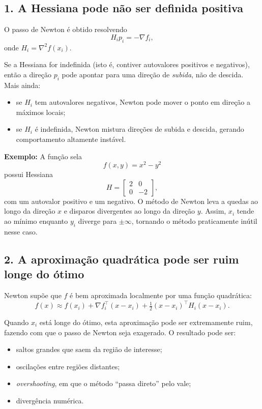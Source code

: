 \documentclass[9pt,a4paper]{extarticle}
\begin{document}
\subsection*{1. A Hessiana pode não ser definida positiva}

O passo de Newton é obtido resolvendo
\[
H_i p_i = -\nabla f_i,
\]
onde $H_i = \nabla^2 f(x_i)$.

Se a Hessiana for indefinida (isto é, contiver autovalores positivos e negativos), 
então a direção $p_i$ pode apontar para uma direção de \emph{subida}, não de 
descida. Mais ainda:

\begin{itemize}
    \item se $H_i$ tem autovalores negativos, Newton pode mover o ponto em direção 
    a máximos locais;
    \item se $H_i$ é indefinida, Newton mistura direções de subida e descida,
    gerando comportamento altamente instável.
\end{itemize}

\noindent
\textbf{Exemplo:} A função sela
\[
f(x,y) = x^2 - y^2
\]
possui Hessiana
\[
H = \begin{bmatrix}
2 & 0\\
0 & -2
\end{bmatrix},
\]
com um autovalor positivo e um negativo. O método de Newton leva a quedas ao longo 
da direção $x$ e disparos divergentes ao longo da direção $y$. Assim, $x_i$ 
tende ao mínimo enquanto $y_i$ diverge para $\pm\infty$, tornando o método 
praticamente inútil nesse caso.

\subsection*{2. A aproximação quadrática pode ser ruim longe do ótimo}

Newton supõe que $f$ é bem aproximada localmente por uma função quadrática:
\[
f(x) \approx f(x_i) + \nabla f_i^\top (x - x_i) + \tfrac12 (x-x_i)^\top H_i (x-x_i).
\]

Quando $x_i$ está longe do ótimo, esta aproximação pode ser extremamente ruim,
fazendo com que o passo de Newton seja exagerado. O resultado pode ser:

\begin{itemize}
    \item saltos grandes que saem da região de interesse;
    \item oscilações entre regiões distantes;
    \item \emph{overshooting}, em que o método ``passa direto'' pelo vale;
    \item divergência numérica.
\end{itemize}
\end{document}

